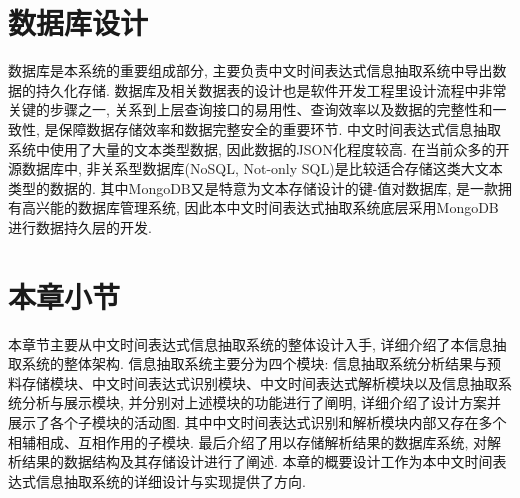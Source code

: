 \section{数据库设计}

数据库是本系统的重要组成部分, 主要负责中文时间表达式信息抽取系统中导出数据的持久化存储.
数据库及相关数据表的设计也是软件开发工程里设计流程中非常关键的步骤之一, 关系到上层查询接口的易用性、查询效率以及数据的完整性和一致性, 是保障数据存储效率和数据完整安全的重要环节.
中文时间表达式信息抽取系统中使用了大量的文本类型数据, 因此数据的JSON化程度较高. 在当前众多的开源数据库中, 非关系型数据库(NoSQL, Not-only SQL)是比较适合存储这类大文本类型的数据的.
其中MongoDB又是特意为文本存储设计的键-值对数据库, 是一款拥有高兴能的数据库管理系统, 因此本中文时间表达式抽取系统底层采用MongoDB进行数据持久层的开发.



\section{本章小节}

本章节主要从中文时间表达式信息抽取系统的整体设计入手, 详细介绍了本信息抽取系统的整体架构.
信息抽取系统主要分为四个模块: 信息抽取系统分析结果与预料存储模块、中文时间表达式识别模块、中文时间表达式解析模块以及信息抽取系统分析与展示模块, 并分别对上述模块的功能进行了阐明, 详细介绍了设计方案并展示了各个子模块的活动图.
其中中文时间表达式识别和解析模块内部又存在多个相辅相成、互相作用的子模块. 最后介绍了用以存储解析结果的数据库系统, 对解析结果的数据结构及其存储设计进行了阐述. 本章的概要设计工作为本中文时间表达式信息抽取系统的详细设计与实现提供了方向.

